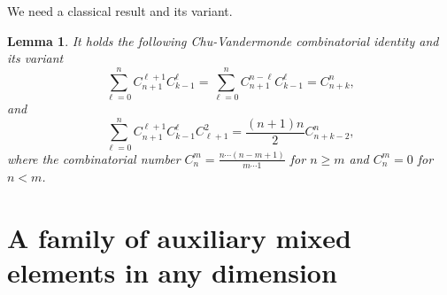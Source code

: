 \documentclass{amsart}
\newtheorem{lemma}{Lemma}[section]
\numberwithin{table}{section}
\numberwithin{figure}{section}
\begin{document}
We need a classical result and its variant.
\begin{lemma}\label{lemma2.4} It holds the following  Chu-Vandermonde combinatorial identity and its variant
\begin{equation}\label{van}
\sum\limits_{\ell=0}^nC_{n+1}^{\ell+1}C_{k-1}^\ell =\sum\limits_{\ell=0}^nC_{n+1}^{n-\ell}C_{k-1}^\ell=C_{n+k}^n,
\end{equation}
and
\begin{equation}\label{varvan}
\sum\limits_{\ell=0}^nC_{n+1}^{\ell+1}C_{k-1}^\ell C_{\ell+1}^2=\frac{(n+1)n}{2}C_{n+k-2}^n,
\end{equation}
where the combinatorial number $C_{n}^m=\frac{n\cdots (n-m+1)}{m\cdots 1}$ for $n\geq m$ and $C_{n}^m=0$ for $n<m$.
\end{lemma}

\section{A family of auxiliary mixed  elements in any dimension}
\end{document}
